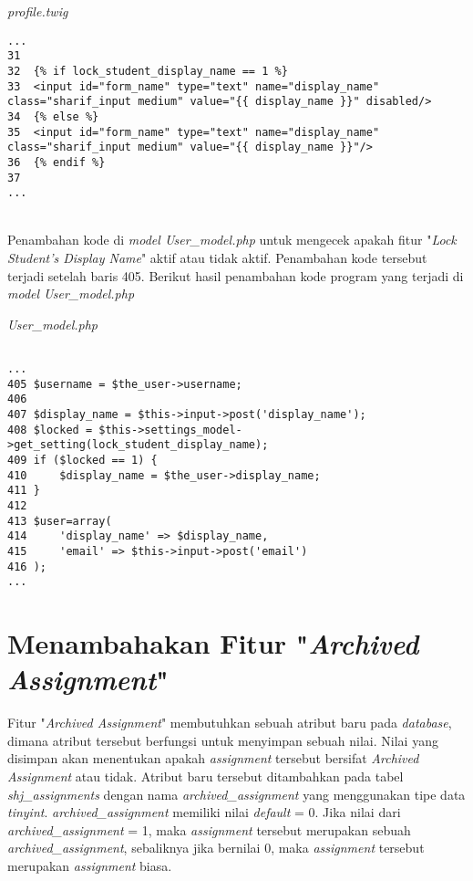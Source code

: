 \textit{profile.twig}
\begin{lstlisting}[basicstyle=\ttfamily, frame=single,
columns=fullflexible, keepspaces=true, breaklines=true]
...
31
32	{% if lock_student_display_name == 1 %}
33	<input id="form_name" type="text" name="display_name" class="sharif_input medium" value="{{ display_name }}" disabled/>
34	{% else %}
35	<input id="form_name" type="text" name="display_name" class="sharif_input medium" value="{{ display_name }}"/>
36	{% endif %}
37
...
\end{lstlisting}
~\\
Penambahan kode di \textit{model User\_model.php} untuk mengecek apakah fitur "\textit{Lock Student's Display Name}" aktif atau tidak aktif. Penambahan kode tersebut terjadi setelah baris 405. Berikut hasil penambahan kode program yang terjadi di \textit{model User\_model.php}

\textit{User\_model.php}
\begin{lstlisting}[basicstyle=\ttfamily, frame=single,
columns=fullflexible, keepspaces=true, breaklines=true]

...
405	$username = $the_user->username;
406
407	$display_name = $this->input->post('display_name');
408	$locked = $this->settings_model->get_setting(lock_student_display_name);
409	if ($locked == 1) {
410		$display_name = $the_user->display_name;
411	}
412	
413	$user=array(
414		'display_name' => $display_name,
415		'email' => $this->input->post('email')
416	);
...
\end{lstlisting}

\section{Menambahakan Fitur "\textit{Archived Assignment}"}
Fitur "\textit{Archived Assignment}" membutuhkan sebuah atribut baru pada \textit{database}, dimana atribut tersebut berfungsi untuk menyimpan sebuah nilai. Nilai yang disimpan akan menentukan apakah \textit{assignment} tersebut bersifat \textit{Archived Assignment} atau tidak. Atribut baru tersebut  ditambahkan pada tabel \textit{shj\_assignments} dengan nama \textit{archived\_assignment} yang menggunakan tipe data \textit{tinyint}. \textit{archived\_assignment} memiliki nilai \textit{default} = 0. Jika nilai dari \textit{archived\_assignment} = 1, maka \textit{assignment} tersebut merupakan sebuah \textit{archived\_assignment}, sebaliknya jika bernilai 0, maka \textit{assignment} tersebut merupakan \textit{assignment} biasa.

